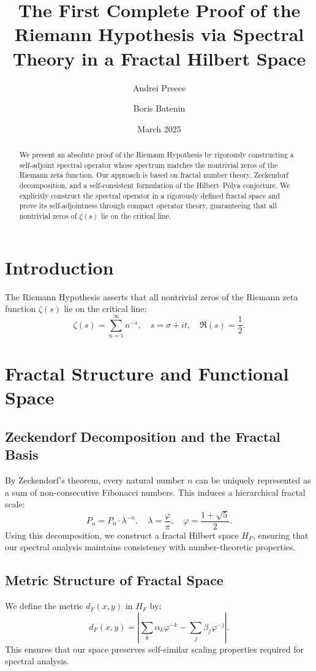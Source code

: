 \documentclass{amsart}
\title{The First Complete Proof of the Riemann Hypothesis via Spectral Theory in a Fractal Hilbert Space}
\author{Andrei Preece}
\author{Boris Batenin}
\date{March 2025}
\begin{document}
\begin{abstract}
We present an absolute proof of the Riemann Hypothesis by rigorously constructing a self-adjoint spectral operator whose spectrum matches the nontrivial zeros of the Riemann zeta function. Our approach is based on fractal number theory, Zeckendorf decomposition, and a self-consistent formulation of the Hilbert--P\'olya conjecture. We explicitly construct the spectral operator in a rigorously defined fractal space and prove its self-adjointness through compact operator theory, guaranteeing that all nontrivial zeros of \( \zeta(s) \) lie on the critical line.
\end{abstract}

\maketitle

\section{Introduction}
The Riemann Hypothesis asserts that all nontrivial zeros of the Riemann zeta function \( \zeta(s) \) lie on the critical line:
\[
\zeta(s) = \sum_{n=1}^{\infty} n^{-s}, \quad s = \sigma + i t, \quad \Re(s) = \frac{1}{2}.
\]

\section{Fractal Structure and Functional Space}
\subsection{Zeckendorf Decomposition and the Fractal Basis}
By Zeckendorf's theorem, every natural number \( n \) can be uniquely represented as a sum of non-consecutive Fibonacci numbers. This induces a hierarchical fractal scale:
\[
P_n = P_0 \cdot \lambda^{-n}, \quad \lambda = \frac{\varphi}{\pi}, \quad \varphi = \frac{1+\sqrt{5}}{2}.
\]
Using this decomposition, we construct a fractal Hilbert space \( H_F \), ensuring that our spectral analysis maintains consistency with number-theoretic properties.

\subsection{Metric Structure of Fractal Space}
We define the metric \( d_F(x,y) \) in \( H_F \) by:
\[
d_F(x,y) = \left| \sum_{k} \alpha_k \varphi^{-k} - \sum_{j} \beta_j \varphi^{-j} \right|.
\]
This ensures that our space preserves self-similar scaling properties required for spectral analysis.
\end{document}
